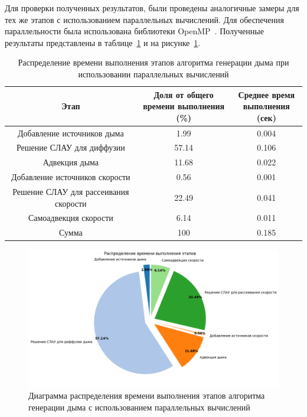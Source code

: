 Для проверки полученных результатов, были проведены аналогичные замеры для тех же этапов с использованием параллельных вычислений. Для обеспечения параллельности была использована библиотеки OpenMP~\cite{OpenMP}. Полученные результаты представлены в таблице~\ref{tab:parallel} и на рисунке~\ref{fig:parallel}.

\begin{table}[H]
	\caption{Распределение времени выполнения этапов алгоритма генерации дыма при использовании параллельных вычислений}
	\label{tab:parallel}
	\centering
	\begin{tabular}{|c|c|c|}
		\hline
		Этап&\shortstack{Доля от общего\\времени выполнения (\%)}&\shortstack{Среднее время\\ выполнения (сек)}\\\hline
		Добавление источников дыма&1.99&0.004\\\hline
		Решение СЛАУ для диффузии &57.14&0.106\\\hline
		Адвекция дыма&11.68&0.022\\\hline
		Добавление источников скорости&0.56&0.001\\\hline
		Решение СЛАУ для рассеивания скорости&22.49&0.041\\\hline
		Самоадвекция скорости&6.14&0.011\\\hline\hline
		Сумма&100&	0.185\\\hline
	\end{tabular}
\end{table}

\begin{figure}[H]
	\centering
	\includegraphics[width=1.0\textwidth,page=1]{assets/img/pie_parallel.png}
	\caption{Диаграмма распределения времени выполнения этапов алгоритма генерации дыма с использованием параллельных вычислений}
	\label{fig:parallel}
\end{figure}

